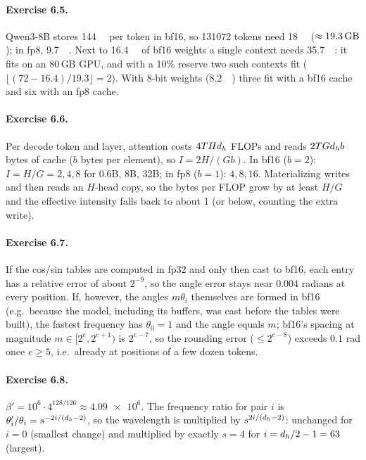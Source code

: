 \paragraph{Exercise 6.5.}
Qwen3-8B stores \SI{144}{\kibi\byte} per token in bf16, so \num{131072} tokens need
\SI{18}{\gibi\byte} ($\approx\SI{19.3}{\giga\byte}$); in fp8, \SI{9.7}{\giga\byte}. Next to
\SI{16.4}{\giga\byte} of bf16 weights a single context needs \SI{35.7}{\giga\byte}: it fits on an
80\,GB GPU, and with a 10\% reserve two such contexts fit ($\lfloor(72-16.4)/19.3\rfloor=2$). With
8-bit weights (\SI{8.2}{\giga\byte}) three fit with a bf16 cache and six with an fp8 cache.

\paragraph{Exercise 6.6.}
Per decode token and layer, attention costs $4THd_{h}$ FLOPs and reads $2TGd_{h} b$ bytes of cache
($b$ bytes per element), so $I=2H/(Gb)$. In bf16 ($b=2$): $I=H/G=2,4,8$ for 0.6B, 8B, 32B; in fp8
($b=1$): $4,8,16$. Materializing  writes and then reads an $H$-head copy, so
the bytes per FLOP grow by at least $H/G$ and the effective intensity falls back to about 1 (or below,
counting the extra write).

\paragraph{Exercise 6.7.}
If the cos/sin tables are computed in fp32 and only then cast to bf16, each entry has a relative
error of about $2^{-9}$, so the angle error stays near $0.004$ radians at every position. If, however,
the angles $m\theta_i$ themselves are formed in bf16 (e.g.\ because the model, including its buffers,
was cast before the tables were built), the fastest frequency has $\theta_0=1$ and the angle equals
$m$; bf16's spacing at magnitude $m\in[2^e,2^{e+1})$ is $2^{e-7}$, so the rounding error
($\le2^{e-8}$) exceeds $0.1$ rad once $e\ge5$, i.e.\ already at positions of a few dozen tokens.

\paragraph{Exercise 6.8.}
$\beta'=10^6\cdot4^{128/126}\approx\num{4.09e6}$. The frequency ratio for pair $i$ is
$\theta_i'/\theta_i=s^{-2i/(d_{h}-2)}$, so the wavelength is multiplied by $s^{2i/(d_{h}-2)}$:
unchanged for $i=0$ (smallest change) and multiplied by exactly $s=4$ for $i=d_{h}/2-1=63$ (largest).

